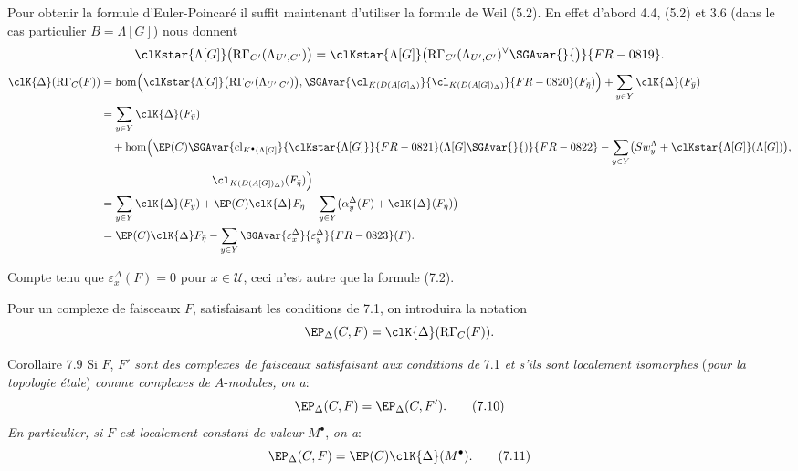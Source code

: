 Pour obtenir la formule d'Euler-Poincaré il suffit maintenant d'utiliser la formule de Weil (5.2). En effet d'abord 4.4, (5.2) et 3.6 (dans le cas particulier $B=\Lambda[G]$) nous donnent
\[
\clKstar{\Lambda[G]}\bigl(\mathrm{R}\Gamma_{C'}(\Lambda_{U',C'})\bigr)
=
\clKstar{\Lambda[G]}\bigl(\mathrm{R}\Gamma_{C'}(\Lambda_{U',C'})^\vee\SGAvar{}{\bigr)}{FR-0819}.
\]
\[
\begin{aligned}
\clK{\Delta}(\mathrm{R}\Gamma_C(F))
&=\operatorname{hom}\Bigl(
\clKstar{\Lambda[G]}\bigl(\mathrm{R}\Gamma_{C'}(\Lambda_{U',C'})\bigr),
\SGAvar{\cl_{K(D(A[G]_\Delta)}}{\cl_{K(D(A[G])_\Delta)}}{FR-0820}(F_{\bar\eta})\Bigr)
 +\sum_{y\in Y}\clK{\Delta}(F_{\bar y})\\
&=\sum_{y\in Y}\clK{\Delta}(F_{\bar y})\\
&\quad +\operatorname{hom}\Bigl(
\EP(C)\SGAvar{\operatorname{cl}_{K^{\bullet}(\Lambda[G]}}{\clKstar{\Lambda[G]}}{FR-0821}(\Lambda[G]\SGAvar{}{)}{FR-0822}
 -\sum_{y\in Y}\bigl(Sw_y^{\Lambda}+\clKstar{\Lambda[G]}(\Lambda[G])\bigr),\\
&\hspace{10em}\cl_{K(D(A[G])_\Delta)}(F_{\bar\eta})\Bigr)\\
&=\sum_{y\in Y}\clK{\Delta}(F_{\bar y})
 +\EP(C)\clK{\Delta}F_{\bar\eta}
 -\sum_{y\in Y}\bigl(\alpha_y^\Delta(F)+\clK{\Delta}(F_{\bar\eta})\bigr)\\
&=\EP(C)\clK{\Delta}F_{\bar\eta}
 -\sum_{y\in Y}\SGAvar{\varepsilon_x^\Delta}{\varepsilon_y^\Delta}{FR-0823}(F).
\end{aligned}
\]

Compte tenu que $\varepsilon_x^\Delta(F)=0$ pour $x\in\mathcal{U}$, ceci n'est autre que la formule (7.2).

Pour un complexe de faisceaux $F$, satisfaisant les conditions de 7.1, on introduira la notation
\[
\EP_\Delta(C,F)=\clK{\Delta}(\mathrm{R}\Gamma_C(F)).
\]

\begin{statement}{Corollaire 7.9}
Si $F$, $F'$ \emph{sont des complexes de faisceaux satisfaisant aux conditions de} 7.1 \emph{et s'ils sont localement isomorphes} (\emph{pour la topologie étale}) \emph{comme complexes de} $A$-\emph{modules, on a}:
\[
\EP_\Delta(C,F)=\EP_\Delta(C,F').
\tag{7.10}
\]
\emph{En particulier, si} $F$ \emph{est localement constant de valeur} $M^\bullet$, \emph{on a}:
\[
\EP_\Delta(C,F)=\EP(C)\clK{\Delta}(M^\bullet).
\tag{7.11}
\]
\end{statement}

